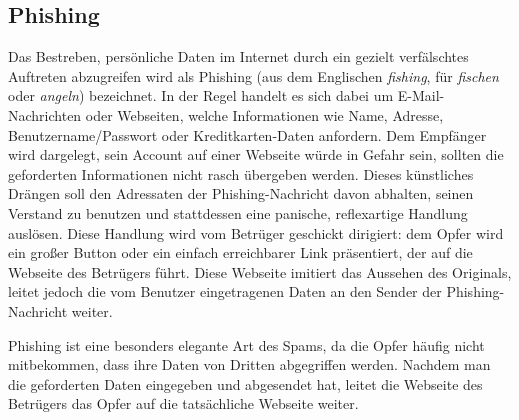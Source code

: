 \subsection{Phishing}
\label{sub:phishing}

Das Bestreben, persönliche Daten im Internet durch ein gezielt verfälschtes
Auftreten abzugreifen wird als Phishing (aus dem Englischen \emph{fishing}, für
\emph{fischen} oder \emph{angeln}) bezeichnet. In der Regel handelt es sich
dabei um E-Mail-Nachrichten oder Webseiten, welche Informationen wie Name,
Adresse, Benutzername/Passwort oder Kreditkarten-Daten anfordern. Dem Empfänger
wird dargelegt, sein Account auf einer Webseite würde in Gefahr sein, sollten
die geforderten Informationen nicht rasch übergeben werden. Dieses künstliches
Drängen soll den Adressaten der Phishing-Nachricht davon abhalten, seinen
Verstand zu benutzen und stattdessen eine panische, reflexartige Handlung
auslösen. Diese Handlung wird vom Betrüger geschickt dirigiert: dem Opfer wird
ein großer Button oder ein einfach erreichbarer Link präsentiert, der auf die
Webseite des Betrügers führt. Diese Webseite imitiert das Aussehen des
Originals, leitet jedoch die vom Benutzer eingetragenen Daten an den Sender der
Phishing-Nachricht weiter.

Phishing ist eine besonders elegante Art des Spams, da die Opfer häufig nicht
mitbekommen, dass ihre Daten von Dritten abgegriffen werden. Nachdem man die
geforderten Daten eingegeben und abgesendet hat, leitet die Webseite des
Betrügers das Opfer auf die tatsächliche Webseite weiter.

